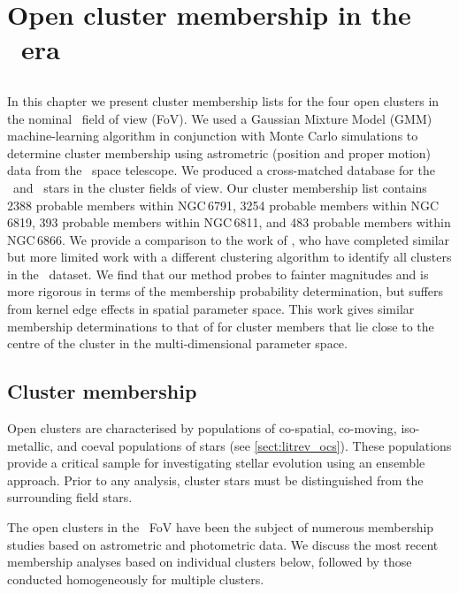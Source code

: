 \chapter[Gaia cluster membership]{Open cluster membership in the \Gaia~era}
\label{chap:membership}

\section*{}
    In this chapter we present cluster membership lists for the four open clusters in the nominal \Kepler~field of view (FoV). We used a Gaussian Mixture Model (GMM) machine-learning algorithm in conjunction with Monte Carlo simulations to determine cluster membership using astrometric (position and proper motion) data from the \Gaia~space telescope. We produced a cross-matched database for the \Gaia~and \Kepler~stars in the cluster fields of view. Our cluster membership list contains 2388 probable members within NGC\,6791, 3254 probable members within NGC\,6819, 393 probable members within NGC\,6811, and 483 probable members within NGC\,6866. We provide a comparison to the work of \cite{cantat-gaudin_gaia_2018}, who have completed similar but more limited work with a different clustering algorithm to identify all clusters in the \Gaia~dataset. We find that our method probes to fainter magnitudes and is more rigorous in terms of the membership probability determination, but suffers from kernel edge effects in spatial parameter space. This work gives similar membership determinations to that of \cite{cantat-gaudin_gaia_2018} for cluster members that lie close to the centre of the cluster in the multi-dimensional parameter space.
\newpage
\section{Cluster membership}

Open clusters are characterised by populations of co-spatial, co-moving, iso-metallic, and coeval populations of stars (see \cref{sect:litrev_ocs}). These populations provide a critical sample for investigating stellar evolution using an ensemble approach. Prior to any analysis, cluster stars must be distinguished from the surrounding field stars. 

The open clusters in the \Kepler~FoV have been the subject of numerous membership studies based on astrometric and photometric data. We discuss the most recent membership analyses based on individual clusters below, followed by those conducted homogeneously for multiple clusters.

